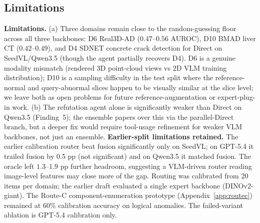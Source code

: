 \subsection{Limitations}
\label{ssec:limitations}
\textbf{Limitations.} (a) Three domains remain close to the random-guessing floor across all three backbones: D6 Real3D-AD ($0.47$--$0.56$ AUROC), D10 BMAD liver CT ($0.42$--$0.49$), and D4 SDNET concrete crack detection for Direct on SeedVL/Qwen3.5 (though the agent partially recovers D4). D6 is a genuine modality mismatch (rendered 3D point-cloud views vs 2D VLM training distribution); D10 is a sampling difficulty in the test split where the reference-normal and query-abnormal slices happen to be visually similar at the slice level; we leave both as open problems for future reference-augmentation or expert-plug-in work. (b) The refutation agent alone is significantly weaker than Direct on Qwen3.5 (Finding~5); the ensemble papers over this via the parallel-Direct branch, but a deeper fix would require tool-usage refinement for weaker VLM backbones, not just an ensemble.
\textbf{Earlier-split limitations retained.} The earlier calibration router beat fusion significantly only on SeedVL; on GPT-5.4 it trailed fusion by 0.5 pp (not significant) and on Qwen3.5 it matched fusion. The oracle left $1.3$--$1.9$ pp further headroom, suggesting a VLM-driven router reading image-level features may close more of the gap. Routing was calibrated from 20 items per domain; the earlier draft evaluated a single expert backbone (DINOv2-giant). The Route-C component-enumeration prototype (Appendix~\ref{app:routec}) remained at $60\%$ calibration accuracy on logical anomalies. The failed-variant ablation is GPT-5.4 calibration only.
